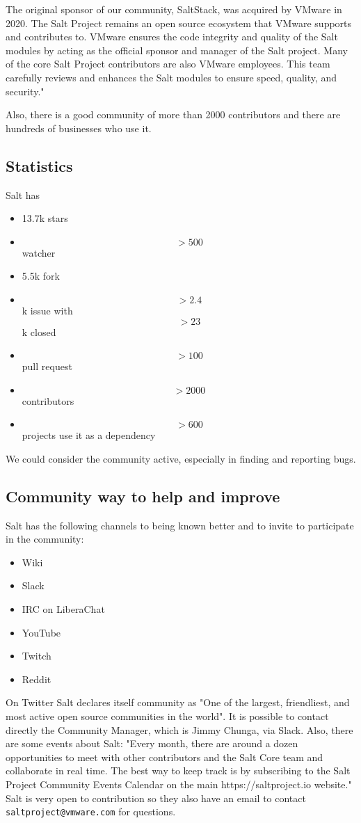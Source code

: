 \documentclass[12pt,a4paper,openright,twoside]{book}
\begin{document}
The original sponsor of our community, SaltStack, was acquired by VMware in 2020. The Salt Project remains an open source ecosystem that VMware supports and contributes to. VMware ensures the code integrity and quality of the Salt modules by acting as the official sponsor and manager of the Salt project. Many of the core Salt Project contributors are also VMware employees. This team carefully reviews and enhances the Salt modules to ensure speed, quality, and security."\cite{saltGitHub}


Also, there is a good community of more than 2000 contributors and there are hundreds of businesses who use it.

\subsection{Statistics}
Salt has 
\begin{itemize}
    \item 13.7k stars
    \item \[>500\] watcher
    \item 5.5k fork
    \item \[>2.4\]k issue with \[>23\]k closed
    \item \[>100\] pull request
    \item \[>2000\] contributors
    \item \[>600\] projects use it as a dependency
\end{itemize}

We could consider the community active, especially in finding and reporting bugs.

\subsection{Community way to help and improve}


Salt has the following channels to being known better and to invite to participate in the community:
\begin{itemize}
    \item Wiki
    \item Slack
    \item IRC on LiberaChat
    \item YouTube
    \item Twitch
    \item Reddit
\end{itemize}
On Twitter Salt declares itself community as "One of the largest, friendliest, and most active open source communities in the world"\cite{saltTwitter}.
It is possible to contact directly the Community Manager, which is Jimmy Chunga, via Slack.
Also, there are some events about Salt:
"Every month, there are around a dozen opportunities to meet with other contributors and the Salt Core team and collaborate in real time. The best way to keep track is by subscribing to the Salt Project Community Events Calendar on the main https://saltproject.io website."\cite{saltGitHub}
Salt is very open to contribution so they also have an email to contact \texttt{saltproject@vmware.com} for questions.
\end{document}
